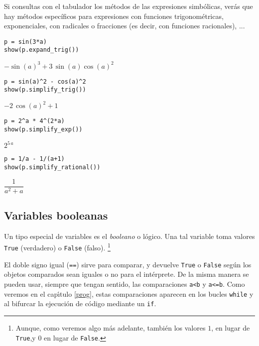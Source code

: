Si consultas con el tabulador los métodos de las expresiones simbólicas, verás
que hay
métodos específicos para expresiones con funciones trigonométricas,
exponenciales, con
radicales o fracciones (es decir, con funciones racionales), ...

\begin{minipage}{.3\textwidth}
\end{minipage}


\begin{lstlisting}[numbers=none]
p = sin(3*a)
show(p.expand_trig())
\end{lstlisting}
\begin{Output}
	$-\sin(a)^3+3 \, \sin(a)\cos(a)^{2}$
\end{Output}

\begin{lstlisting}[numbers=none]
p = sin(a)^2 - cos(a)^2
show(p.simplify_trig())
\end{lstlisting}
\begin{Output}
	$-2\,\cos(a)^2+1$
\end{Output}

\begin{lstlisting}[numbers=none]
p = 2^a * 4^(2*a)
show(p.simplify_exp())
\end{lstlisting}
\begin{Output}
	$2^{5\,a}$
\end{Output}
\begin{lstlisting}[numbers=none]
p = 1/a - 1/(a+1)
show(p.simplify_rational())
\end{lstlisting}
\begin{Output}
	$\dfrac{1}{a^{2} + a}$
\end{Output}



\subsection{Variables booleanas}\label{bool}
Un tipo especial de variables es el \emph{booleano} o lógico. Una tal variable
toma
valores \verb|True| (verdadero) o \verb|False| (falso). \footnote{Aunque, como
veremos algo más adelante, también los valores $1$, en lugar de {\tt True},y $0$
en lugar de {\tt False}.}



El  doble signo igual ({\tt ==}) sirve para comparar,
y devuelve \lstinline|True| o \lstinline|False| según los objetos comparados
sean iguales o no para el intérprete. De la misma manera se pueden usar, siempre
que tengan sentido, las comparaciones \lstinline|a<b| y \lstinline|a<=b|. 
Como veremos en el cap\'{\i}tulo \ref{prog}, estas comparaciones aparecen en los
bucles \lstinline|while| y al bifurcar la ejecuci\'on de c\'odigo mediante un
\lstinline|if|.

